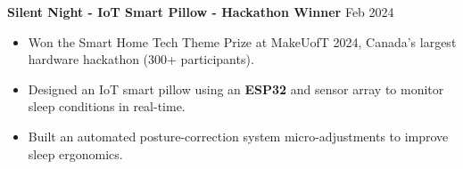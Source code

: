 \documentclass[10pt,letterpaper]{article}
\begin{document}
\textbf{Silent Night - IoT Smart Pillow - Hackathon Winner} \hfill Feb 2024 \\
\begin{itemize}
    \item Won the Smart Home Tech Theme Prize at MakeUofT 2024, Canada's largest hardware hackathon (300+ participants).  
    \item Designed an IoT smart pillow using an \textbf{ESP32} and sensor array to monitor sleep conditions in real-time.
    \item Built an automated posture-correction system micro-adjustments to improve sleep ergonomics. 
\end{itemize}



\end{document}
